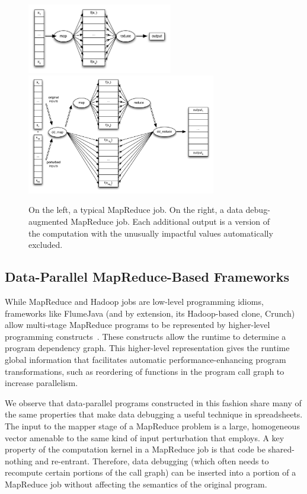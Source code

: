 \begin{figure}[t]
	\includegraphics[width=2.5in]{images/mapreduce}
  \hfill
	\includegraphics[width=3.25in]{images/mapreduce_dd}
	\caption{
		On the left, a typical MapReduce job.  On the right, a data debug-augmented MapReduce job.  Each additional output is a version of the computation with the unusually impactful values automatically excluded.\label{fig:mapreduce_pipeline}
	}
\end{figure}

\subsection*{Data-Parallel MapReduce-Based Frameworks}

While MapReduce and Hadoop jobs are low-level programming idioms,
frameworks like FlumeJava (and by extension, its Hadoop-based clone, Crunch)
allow multi-stage MapReduce programs to be represented by higher-level
programming constructs~\cite{pldi:flumejava}.  These constructs allow
the runtime to determine a program dependency graph.  This
higher-level representation gives the runtime global information that
facilitates automatic performance-enhancing program transformations,
such as reordering of functions in the program call graph to increase
parallelism.

We observe that data-parallel programs constructed in this fashion
share many of the same properties that make data debugging a useful
technique in spreadsheets.  The input to the mapper stage of a
MapReduce problem is a large, homogeneous vector amenable to the same
kind of input perturbation that \checkcell{} employs.  A key property
of the computation kernel in a MapReduce job is that code be
shared-nothing and re-entrant. Therefore, data debugging (which often
needs to recompute certain portions of the call graph) can be inserted
into a portion of a MapReduce job without affecting the semantics of
the original program.

